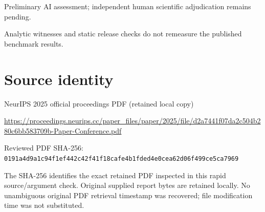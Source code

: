 \documentclass[11pt]{article}
\begin{document}
Preliminary AI assessment; independent human scientific adjudication remains pending.\par

Analytic witnesses and static release checks do not remeasure the published benchmark results.\par

\section*{Source identity}

NeurIPS 2025 official proceedings PDF (retained local copy)

\url{https://proceedings.neurips.cc/paper_files/paper/2025/file/d2a7441f07da2c504b280c6bb583709b-Paper-Conference.pdf}

Reviewed PDF SHA-256: \nolinkurl{0191a4d9a1c94f1ef442c42f41f18cafe4b1fded4e0cea62d06f499ce5ca7969}

The SHA-256 identifies the exact retained PDF inspected in this rapid source/argument check. Original supplied report bytes are retained locally. No unambiguous original PDF retrieval timestamp was recovered; file modification time was not substituted.
\end{document}
